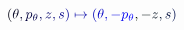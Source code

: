 \documentclass[12pt]{article}
\begin{document}
\makeatletter
\renewcommand*{\@textcolor}[3]{%
  \protect\leavevmode
  \begingroup
    \color#1{#2}#3%
  \endgroup
}
\makeatother
\begin{displaymath}
\mathcolor[RGB]{0,0,15}{(} \mathcolor[RGB]{0,0,30}{\theta} \mathcolor[RGB]{0,0,45}{,} \mathcolor[RGB]{0,0,60}{p} _ { \mathcolor[RGB]{0,0,75}{\theta} } \mathcolor[RGB]{0,0,90}{,} \mathcolor[RGB]{0,0,105}{z} \mathcolor[RGB]{0,0,120}{,} \mathcolor[RGB]{0,0,135}{s} \mathcolor[RGB]{0,0,150}{)} \mathcolor[RGB]{0,0,165}{\mapsto} \mathcolor[RGB]{0,0,180}{(} \mathcolor[RGB]{0,0,195}{\theta} \mathcolor[RGB]{0,0,210}{,} \mathcolor[RGB]{0,0,225}{-} \mathcolor[RGB]{0,0,240}{p} _ { \mathcolor[RGB]{0,0,255}{\theta} } \mathcolor[RGB]{0,15,0}{,} \mathcolor[RGB]{0,15,15}{-} \mathcolor[RGB]{0,15,30}{z} \mathcolor[RGB]{0,15,45}{,} \mathcolor[RGB]{0,15,60}{s} \mathcolor[RGB]{0,15,75}{)}
\end{displaymath}
\end{document}
